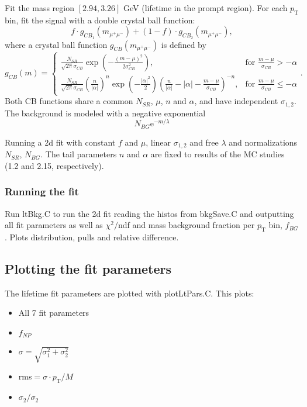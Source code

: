 \documentclass{article}
\newcommand{\pt}{p_\text{T}}
\begin{document}
Fit the mass region $[2.94, 3.26]$ GeV (lifetime in the prompt region). For each $\pt$ bin, fit the signal with a double crystal ball function:
\begin{equation}
f\cdot g_{CB_1}(m_{\mu^+\mu^-})+(1-f)\cdot g_{CB_2}(m_{\mu^+\mu^-}),
\end{equation}
where a crystal ball function $g_{CB}(m_{\mu^+\mu^-})$ is defined by
\begin{equation}
g_{CB}(m) = \begin{cases}
\frac{N_{SR}}{\sqrt{2\pi}\sigma_{CB}}\exp\left(-\frac{(m-\mu)^2}{2\sigma^2_{CB}}\right), & \text{for }\frac{m-\mu}{\sigma_{CB}} > -\alpha \\
\frac{N_{SR}}{\sqrt{2\pi}\sigma_{CB}}\left(\frac{n}{|\alpha|}\right)^n\exp\left(-\frac{|\alpha|^2}{2}\right)\left(\frac{n}{|\alpha|}-|\alpha|-\frac{m-\mu}{\sigma_{CB}}\right)^{-n}, & \text{for }\frac{m-\mu}{\sigma_{CB}}\leq-\alpha
\end{cases}.
\end{equation}
Both CB functions share a common $N_{SR}$, $\mu$, $n$ and $\alpha$, and have independent $\sigma_{1,2}$. The background is modeled with a negative exponential
\begin{equation}
N_{BG} \text{e}^{- m / \lambda}
\end{equation}

Running a 2d fit with constant $f$ and $\mu$, linear $\sigma_{1,2}$ and free $\lambda$ and normalizations $N_{SR}$, $N_{BG}$. The tail parameters $n$ and $\alpha$ are fixed to results of the MC studies (1.2 and 2.15, respectively). 

\subsubsection{Running the fit}

Run ltBkg.C to run the 2d fit reading the histos from bkgSave.C and outputting all fit parameters as well as $\chi^2/$ndf and mass background fraction per $\pt$ bin, $f_{BG}$. Plots distribution, pulls and relative difference.

\subsection{Plotting the fit parameters}

The lifetime fit parameters are plotted with plotLtPars.C. This plots:
\begin{itemize}
\item All 7 fit parameters
\item $f_{NP}$
\item $\sigma=\sqrt{\sigma_1^2+\sigma_2^2}$
\item rms$=\sigma\cdot\pt/M$
\item $\sigma_2/\sigma_2$
\end{itemize}
\end{document}
